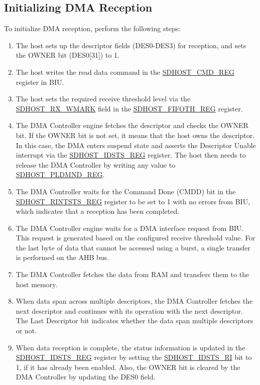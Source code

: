 \documentclass[main\_\_EN.tex]{subfiles}
\begin{document}
\subsection{Initializing DMA Reception}\label{sec:sdhost-dma-rx}

To initialize DMA reception, perform the following steps:

\begin{enumerate}
\item The host sets up the descriptor fields (DES0-DES3) for reception, and sets the OWNER bit (DES0[31]) to 1.
\item The host writes the read data command in the \hyperref[regdesc:SDHOSTCMDREG]{SDHOST\_CMD\_REG} register in BIU. 
\item The host sets the required receive threshold level via the \hyperref[fielddesc:SDHOSTRXWMARK]{SDHOST\_RX\_WMARK} field in the \hyperref[regdesc:SDHOSTFIFOTHREG]{SDHOST\_FIFOTH\_REG} register. 
\item The DMA Controller engine fetches the descriptor and checks the OWNER bit. If the OWNER bit is not set, it means that the host owns the descriptor. In this case, the DMA enters suspend state and asserts the Descriptor Unable interrupt via the \hyperref[regdesc:SDHOSTIDSTSREG]{SDHOST\_IDSTS\_REG} register. The host then needs to release the DMA Controller by writing any value to \hyperref[regdesc:SDHOSTPLDMNDREG]{SDHOST\_PLDMND\_REG}. 
\item The DMA Controller waits for the Command Done (CMDD) bit in the \hyperref[regdesc:SDHOSTRINTSTSREG]{SDHOST\_RINTSTS\_REG} register to be set to 1 with no errors from BIU, which indicates that a reception has been completed. 
\item The DMA Controller engine waits for a DMA interface request from BIU. This request is generated based on the configured receive threshold value. For the last byte of data that cannot be accessed using a burst, a single transfer is performed on the AHB bus. 
\item The DMA Controller fetches the data from RAM and transfers them to the host memory. 
\item When data span across multiple descriptors, the DMA Controller fetches the next descriptor and continues with its operation with the next descriptor. The Last Descriptor bit indicates whether the data span multiple descriptors or not. 
\item When data reception is complete, the status information is updated in the \hyperref[regdesc:SDHOSTIDSTSREG]{SDHOST\_IDSTS\_REG} register by setting the \hyperref[fielddesc:SDHOSTIDSTSRI]{SDHOST\_IDSTS\_RI} bit to 1, if it has already been enabled. Also, the OWNER bit is cleared by the DMA Controller by updating the DES0 field.
\end{enumerate}
\end{document}
